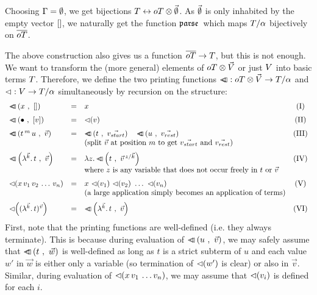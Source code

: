 \documentclass[submission,copyright,creativecommons]{eptcs}
\begin{document}
Choosing $\Gamma = \emptyset$, we get bijections $T \leftrightarrow oT \otimes {\vec {\emptyset}}$. As $\vec {\emptyset}$ is only inhabited by the empty vector $[]$, we naturally get the 
function ${\mathfrak {parse } \,}$ which maps $T / \alpha$ bijectively on $\overline{oT}$.



The above construction also gives us a function $\overline{oT} \rightarrow T$, but this is not enough. We want to transform the (more general) elements of $oT \otimes \vec {V}$ or just $V$ into basic terms $T$.
Therefore, we
define the two printing functions ${\lhd \hspace{-6pt} \lhd} : oT \otimes \vec {V} \rightarrow T / \alpha$ and ${\mathord{\lhd}} : V \rightarrow T / \alpha$ simultaneously by recursion on the structure:
\[
\begin{array}{lclc}
\medskip
\pr{x}{\emptyVec} & = & x & \lab I \\
\medskip
\pr{\ovar}{[v]} & = & \prVal v & \lab {II} \\
\pr{t \oapp m u}{\vec v} & = & \ApA {\pr {t}{\vec{v_{start}}}  }  {\quad \pr {u}{\vec{v_{rest}}}}  & \lab {III} \\
\medskip
&& \mbox{(split $\vec v$ at position $m$ to get $\vec{v_{start}}$ and $\vec{v_{rest}}$)} \\
\pr{\LaO {\vec k} t}{\vec v} & = & \LaA z {\pr {t} {  \multiinsert{\vec v}{\vec k}{z}   }}   & \lab {IV}\\
\medskip
&& \mbox{where $z$ is any variable that does not occur freely in $t$ or $\vec v$ } \\
\prVal{x \sspace v_1 \sspace v_2 \sspace \ldots \sspace v_n} & = & x \ \prVal{v_1} \ \prVal{v_2} \ \ldots \ \prVal{v_n} & \lab V\\
\medskip && \mbox{(a large application simply becomes an application of terms)} \\
\prVal{\Val {\vec k} t {\vec v}} & = & \pr{\LaO {\vec k} t}{\vec v}  & \lab {VI}\\
\end{array}
\]
First, note that the printing functions are well-defined (i.e. they always terminate). This is because during evaluation of ${ {\lhd \hspace{-6pt} \lhd} \left( u \ , \ \vec v \right)}$, we may safely assume that ${ {\lhd \hspace{-6pt} \lhd} \left( t \ , \ \vec w \right)}$ is well-defined as long as $t$ is a strict subterm of $u$ and each value $w'$ in $\vec w$ is either only a variable (so termination of ${\lhd \hspace{-2pt} \left( w' \right)}$ is clear) or also in $\vec v$. Similar, during evaluation of ${\lhd \hspace{-2pt} \left( x \, v_1 \, \ldots v_n \right)}$, we may assume that ${\lhd \hspace{-2pt} \left( v_i \right)}$ is defined for each $i$.
\end{document}
